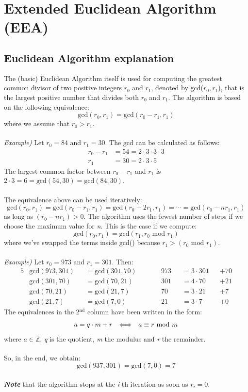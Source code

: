 \documentclass[11pt, a4paper]{article}
\newcommand{\mymod}{
    \text{ mod }
}
\newcommand{\ifonlyif}{\hspace{0.25cm}\Longleftrightarrow\hspace{0.25cm}}
\begin{document}
\newpage


\newpage
\section{Extended Euclidean Algorithm (EEA)}
\subsection{Euclidean Algorithm explanation}
The (basic) Euclidean Algorithm itself is used for computing the greatest common divisor of two positive integers $r_0$ and $r_1$, denoted by gcd($r_0,r_1$), that is the largest positive number that divides both $r_0$ and $r_1$. The algorithm is based on the following equivalence:
$$\text{gcd}(r_0,r_1)=\text{gcd}(r_0-r_1,r_1)$$
where we assume that $r_0>r_1$.\\\\
\textit{Example)} Let $r_0=84$ and $r_1=30$. The gcd can be calculated as follows:
\begin{equation*}
    \begin{split}
        r_0-r_1&=54=2\cdot3\cdot3\cdot3\\
        r_1&=30=2\cdot3\cdot5
    \end{split}
\end{equation*}
The largest common factor between $r_0-r_1$ and $r_1$ is $2\cdot3=6=\text{gcd}(54,30)=\text{gcd}(84,30)$.\\\\
The equivalence above can be used iteratively:
$$\text{gcd}(r_0,r_1)=\text{gcd}(r_0-r_1,r_1)=\text{gcd}(r_0-2r_1,r_1)=\cdots=\text{gcd}(r_0-nr_1,r_1)$$
as long as $(r_0-nr_1)>0$. The algorithm uses the fewest number of steps if we choose the maximum value for \textit{n}. This is the case if we compute:
$$\text{gcd}(r_0,r_1)=\text{gcd}(r_1,r_0\mymod r_1)$$
where we've swapped the terms inside gcd() because $r_1>(r_0\mymod r_1)$.\\\\
\textit{Example)} Let $r_0=973$ and $r_1=301$. Then:
\begin{alignat*}{5}
    &\text{gcd}(973,301)&&=\text{gcd}(301,70) \qquad&&973&&=3\cdot301&&+70\\
    &\text{gcd}(301,70)&&=\text{gcd}(70,21)  \qquad&&301&&=4\cdot70&&+21\\
    &\text{gcd}(70,21)&&=\text{gcd}(21,7)  \qquad&&70&&=3\cdot21&&+7\\
    &\text{gcd}(21,7)&&=\text{gcd}(7,0)  \qquad&&21&&=3\cdot7&&+0
\end{alignat*}
The equivalences in the 2$^\text{nd}$ column have been written in the form:
$$a=q\cdot m+r\ifonlyif a \equiv r\mymod m$$
where $a\in\mathbb{Z}$, \textit{q} is the quotient, \textit{m} the modulus and \textit{r} the remainder.\\\\
So, in the end, we obtain: $$\text{gcd}(937,301)=\text{gcd}(7,0)=7$$\\
\textit{\textbf{Note}} that the algorithm stops at the \textit{i}-th iteration as soon as $r_i=0$.
\end{document}
